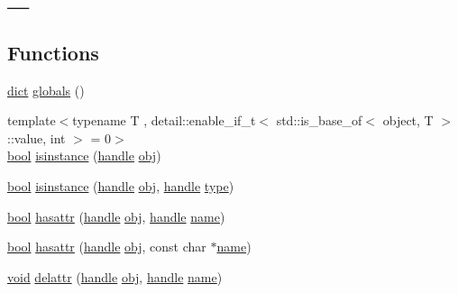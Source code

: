 \hypertarget{group__python__builtins}{}\section{\+\_\+}
\label{group__python__builtins}
\subsection*{Functions}
\begin{DoxyCompactItemize}
\item 
\mbox{\hyperlink{classdict}{dict}} \mbox{\hyperlink{group__python__builtins_ga0be04c9e8c8a6833cabae628e2243b6c}{globals}} ()
\item 
{\footnotesize template$<$typename T , detail\+::enable\+\_\+if\+\_\+t$<$ std\+::is\+\_\+base\+\_\+of$<$ object, T $>$\+::value, int $>$  = 0$>$ }\\\mbox{\hyperlink{asdl_8h_af6a258d8f3ee5206d682d799316314b1}{bool}} \mbox{\hyperlink{group__python__builtins_gade020f155a1f133cc9e245bac2981280}{isinstance}} (\mbox{\hyperlink{classhandle}{handle}} \mbox{\hyperlink{_s_d_l__opengl__glext_8h_a0c0d4701a6c89f4f7f0640715d27ab26}{obj}})
\item 
\mbox{\hyperlink{asdl_8h_af6a258d8f3ee5206d682d799316314b1}{bool}} \mbox{\hyperlink{group__python__builtins_ga563dccaeb6eca82ece3f56c5edfe838b}{isinstance}} (\mbox{\hyperlink{classhandle}{handle}} \mbox{\hyperlink{_s_d_l__opengl__glext_8h_a0c0d4701a6c89f4f7f0640715d27ab26}{obj}}, \mbox{\hyperlink{classhandle}{handle}} \mbox{\hyperlink{_s_d_l__opengl_8h_ad5ddf6fca7b585646515660e810e0188}{type}})
\item 
\mbox{\hyperlink{asdl_8h_af6a258d8f3ee5206d682d799316314b1}{bool}} \mbox{\hyperlink{group__python__builtins_gacc0a69f008d341c07ff939e0580c5985}{hasattr}} (\mbox{\hyperlink{classhandle}{handle}} \mbox{\hyperlink{_s_d_l__opengl__glext_8h_a0c0d4701a6c89f4f7f0640715d27ab26}{obj}}, \mbox{\hyperlink{classhandle}{handle}} \mbox{\hyperlink{structname}{name}})
\item 
\mbox{\hyperlink{asdl_8h_af6a258d8f3ee5206d682d799316314b1}{bool}} \mbox{\hyperlink{group__python__builtins_gaec38f84a4416ddc3b311ecdbff659ed7}{hasattr}} (\mbox{\hyperlink{classhandle}{handle}} \mbox{\hyperlink{_s_d_l__opengl__glext_8h_a0c0d4701a6c89f4f7f0640715d27ab26}{obj}}, const char $\ast$\mbox{\hyperlink{structname}{name}})
\item 
\mbox{\hyperlink{_s_d_l__opengles2__gl2ext_8h_ae5d8fa23ad07c48bb609509eae494c95}{void}} \mbox{\hyperlink{group__python__builtins_ga74473a4403c91a8862e2b384245cb628}{delattr}} (\mbox{\hyperlink{classhandle}{handle}} \mbox{\hyperlink{_s_d_l__opengl__glext_8h_a0c0d4701a6c89f4f7f0640715d27ab26}{obj}}, \mbox{\hyperlink{classhandle}{handle}} \mbox{\hyperlink{structname}{name}})

\end{DoxyCompactItemize}
